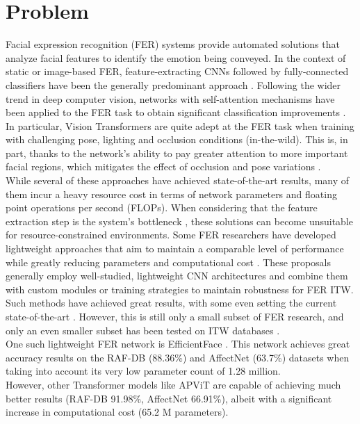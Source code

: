\section{Problem}

Facial expression recognition (FER) systems provide automated solutions that analyze facial features to identify the emotion being conveyed. In the context of static or image-based FER, feature-extracting CNNs followed by fully-connected classifiers have been the generally predominant approach \cite{canal2022survey}. Following the wider trend in deep computer vision, networks with self-attention mechanisms have been applied to the FER task to obtain significant classification improvements \cite{apvit2023, lengwe2023pattlite, xue2021transfer, ma2023asf, huang2021, pecoraro2022lhc}. In particular, Vision Transformers are quite adept at the FER task when training with challenging pose, lighting and occlusion conditions (in-the-wild). This is, in part, thanks to the network's ability to pay greater attention to more important facial regions, which mitigates the effect of occlusion and pose variations \cite{karnati2023survey}.\\

While several of these approaches have achieved state-of-the-art results, many of them incur a heavy resource cost in terms of network parameters and floating point operations per second (FLOPs).
When considering that the feature extraction step is the system's bottleneck \cite{karnati2023survey}, these solutions can become unsuitable for resource-constrained environments.
Some FER researchers have developed lightweight approaches that aim to maintain a comparable level of performance while greatly reducing parameters and computational cost \cite{eff-face2021, lengwe2023pattlite, hewitt2018, mitre2020, barros2020fc}.
These proposals generally employ well-studied, lightweight CNN architectures and combine them with custom modules or training strategies to maintain robustness for FER ITW.
Such methods have achieved great results, with some even setting the current state-of-the-art \cite{lengwe2023pattlite}.
However, this is still only a small subset of FER research, and only an even smaller subset has been tested on ITW databases \cite{eff-face2021}.\\

One such lightweight FER network is EfficientFace \cite{eff-face2021}.
This network achieves great accuracy results on the RAF-DB (88.36\%) and AffectNet (63.7\%) datasets when taking into account its very low parameter count of 1.28 million.\\
However, other Transformer models like APViT \cite{apvit2023} are capable of achieving much better results (RAF-DB 91.98\%, AffectNet 66.91\%), albeit with a significant increase in computational cost (65.2 M parameters).\\

